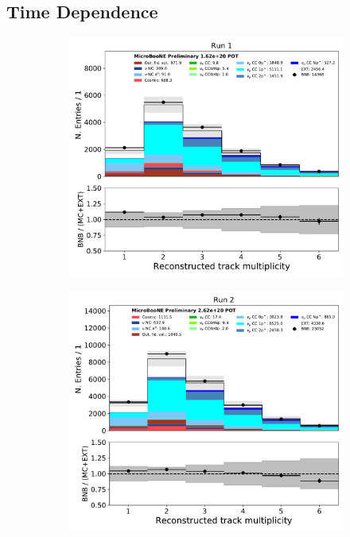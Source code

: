 \subsection{Time Dependence}
\label{ssec:Appendix:numu:timedep}
\begin{figure}[hbt!] 
\begin{center}
    \begin{subfigure}[b]{0.35\textwidth}
        \centering
        \includegraphics[width=1.00\textwidth]{NuMuCCsel/Images/Ryan/Run1/reco_ntrack_08052020_full_samples_longest_noCRT_event_category.pdf}
    \end{subfigure}
    \begin{subfigure}[b]{0.35\textwidth}
        \centering
        \includegraphics[width=1.00\textwidth]{NuMuCCsel/Images/Ryan/Run2/reco_ntrack_08052020_full_samples_longest_noCRT_event_category.pdf}

\end{subfigure}
\end{center}
\end{figure}
